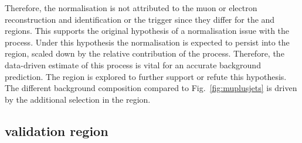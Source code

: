 %
Therefore, the normalisation is not attributed to the muon or electron reconstruction and identification or the trigger since they differ for the \muplusjets and \eleplusjets regions. This supports the original hypothesis of a normalisation issue with the \IWj process. Under this hypothesis the normalisation is expected to persist into the \metplusjets region, scaled down by the relative contribution of the \IWj process. Therefore, the data-driven estimate of this process is vital for an accurate background prediction. The \tauplusjets region is explored to further support or refute this hypothesis. The different background composition compared to Fig.~\ref{fig:muplusjets} is driven by the additional \ptmiss selection in the \eleplusjets region.


\subsection{\tauplusjets validation region}


